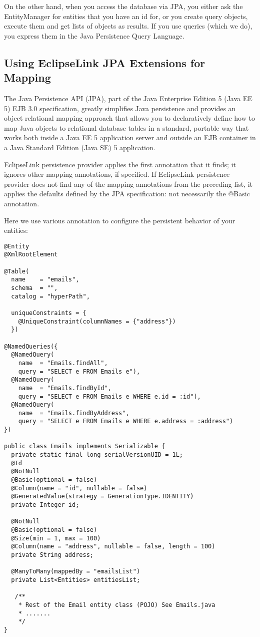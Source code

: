 On the other hand, when you access the database via JPA, you either ask the EntityManager for entities that you have an id for, or you create query objects, execute them and get lists of objects as results. If you use queries (which we do), you express them in the Java Persistence Query Language.

\subsection{Using EclipseLink JPA Extensions for Mapping}
The Java Persistence API (JPA), part of the Java Enterprise Edition 5 (Java EE 5) EJB 3.0 specification, greatly simplifies Java persistence and provides an object relational mapping approach that allows you to declaratively define how to map Java objects to relational database tables in a standard, portable way that works both inside a Java EE 5 application server and outside an EJB container in a Java Standard Edition (Java SE) 5 application.

EclipseLink persistence provider applies the first annotation that it finds; it ignores other mapping annotations, if specified. If EclipseLink persistence provider does not find any of the mapping annotations from the preceding list, it applies the defaults defined by the JPA specification: not necessarily the @Basic annotation. 

Here we use various annotation to configure the persistent behavior of your entities:
\begin{lstlisting}[label=Emails JPA entity,caption=Emails JPA entity]
@Entity
@XmlRootElement

@Table(
  name    = "emails", 
  schema  = "",   
  catalog = "hyperPath", 
  
  uniqueConstraints = {
    @UniqueConstraint(columnNames = {"address"})
  })

@NamedQueries({
  @NamedQuery(
    name  = "Emails.findAll", 
    query = "SELECT e FROM Emails e"),
  @NamedQuery(
    name  = "Emails.findById", 
    query = "SELECT e FROM Emails e WHERE e.id = :id"),
  @NamedQuery(
    name  = "Emails.findByAddress", 
    query = "SELECT e FROM Emails e WHERE e.address = :address")
})
    
public class Emails implements Serializable {
  private static final long serialVersionUID = 1L;
  @Id
  @NotNull    
  @Basic(optional = false)  
  @Column(name = "id", nullable = false)  
  @GeneratedValue(strategy = GenerationType.IDENTITY)
  private Integer id;

  @NotNull  
  @Basic(optional = false)
  @Size(min = 1, max = 100)
  @Column(name = "address", nullable = false, length = 100)
  private String address;

  @ManyToMany(mappedBy = "emailsList")
  private List<Entities> entitiesList;

   /**
    * Rest of the Email entity class (POJO) See Emails.java
  	* .......
  	*/
}
\end{lstlisting}


